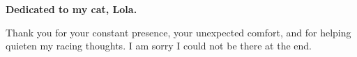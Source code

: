 \documentclass[twoside]{mitthesis}
\begin{document}

\maketitle*




% 




\begin{abstract}
\end{abstract}


\cleardoublepage
{}
\thispagestyle{empty}
\vspace*{\fill}
\begin{center}
	\textbf{Dedicated to my cat, Lola.}

	\vspace{1.5em}

	Thank you for your constant presence, your unexpected comfort, and for helping quieten my racing thoughts. I am sorry I could not be there at the end.
\end{center}
\vspace*{\fill}
\cleardoublepage


\tableofcontents
\listoffigures
\listoftables

\end{document}
